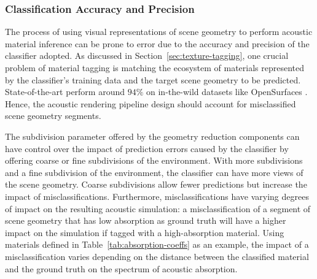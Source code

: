 \subsubsection{Classification Accuracy and Precision}
The process of using visual representations of scene geometry to perform acoustic material inference can be prone to error due to the accuracy and precision of the classifier adopted. As discussed in Section~\ref{sec:texture-tagging}, one crucial problem of material tagging is matching the ecosystem of materials represented by the classifier's training data and the target scene geometry to be predicted. State-of-the-art  perform around $94\%$ on in-the-wild datasets like OpenSurfaces \citep{he2016deep, bell2013opensurfaces}. Hence, the acoustic rendering pipeline design should account for misclassified scene geometry segments.\par
The subdivision parameter offered by the geometry reduction components can have control over the impact of prediction errors caused by the classifier by offering coarse or fine subdivisions of the environment. With more subdivisions and a fine subdivision of the environment, the classifier can have more views of the scene geometry. Coarse subdivisions allow fewer predictions but increase the impact of misclassifications. Furthermore, misclassifications have varying degrees of impact on the resulting acoustic simulation: a misclassification of a segment of scene geometry that has low absorption as ground truth will have a higher impact on the simulation if tagged with a high-absorption material. Using materials defined in Table~\ref{tab:absorption-coeffs} as an example, the impact of a misclassification varies depending on the distance between the classified material and the ground truth on the spectrum of acoustic absorption.


